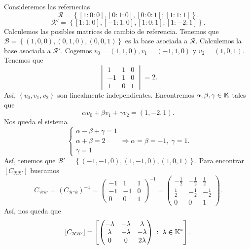 \begin{eg}
Consideremos las refernecias 
\[\mathcal{R} = \left\{ [1:0:0], [0:1:0], [0:0:1]; [1:1:1]\right\}  .\]
\[\mathcal{R}' = \left\{[1:1:0], [-1:1:0], [1:0:1]; [1: -2:1] \right\}  .\]
Calculemos las posibles matrices de cambio de referencia. Tenemos que $\displaystyle \mathcal{B} = \left\{ \left(1,0,0\right), \left(0,1,0\right), \left(0,0,1\right)\right\}  $ es la base asociada a $\displaystyle \mathcal{R} $. Calculemos la base asociada a $\displaystyle \mathcal{R}' $. Cogemos $\displaystyle v_{0}= \left(1,1,0\right), v_{1} = \left(-1,1,0\right) $ y $\displaystyle v_{2} = \left(1,0,1\right) $. Tenemos que
\[ \begin{vmatrix}  1 & 1 & 0 \\ - 1 & 1 & 0 \\ 1 & 0 & 1\end{vmatrix}  = 2 .\]
Así, $\displaystyle \left\{ v_{0}, v_{1}, v_{2}\right\}  $ son linealmente independientes. Encontremos $\displaystyle \alpha, \beta, \gamma \in \mathbb{K} $ tales que 
\[\alpha v_{0} + \beta v_{1} + \gamma v_{2} = \left(1,-2,1\right) .\]
Nos queda el sistema 
\[
\begin{cases}
\alpha-\beta+\gamma = 1 \\
\alpha + \beta = 2 \\
\gamma = 1
\end{cases}
\Rightarrow \alpha = \beta = -1, \; \gamma = 1.\]
Así, tenemos que $\displaystyle \mathcal{B}' = \left\{ \left(-1,-1,0\right), \left(1, - 1, 0\right), \left(1, 0, 1\right)\right\}  $. Para encontrar $\displaystyle [C_{\mathcal{R}\mathcal{R}'}] $ buscamos  
\[ C_{\mathcal{B}\mathcal{B}'} = \left(C_{\mathcal{B}'\mathcal{B}}\right)^{-1} = \begin{pmatrix} -1 & 1 & 1 \\ - 1 & - 1 & 0 \\ 0 & 0 & 1 \end{pmatrix}^{-1}= \begin{pmatrix} -\frac{1}{2} & -\frac{1}{2} & \frac{1}{2} \\
\frac{1}{2} & -\frac{1}{2} & -\frac{1}{2} \\
0 & 0 & 1\end{pmatrix}.\]
Así, nos queda que 
\[[C_{\mathcal{R}\mathcal{R}'}] = \left[\begin{pmatrix} -\lambda & - \lambda & \lambda \\ \lambda & - \lambda & - \lambda \\ 0 & 0 & 2\lambda  \end{pmatrix} \; : \; \lambda \in \mathbb{K}^{*}\right]  .\]
\end{eg}
